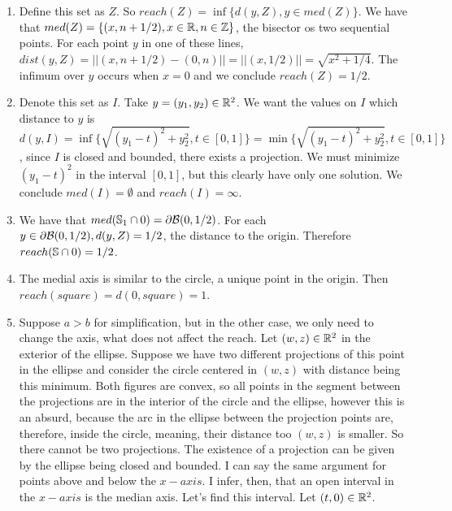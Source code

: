 \begin{enumerate}
    \item Define this set as $Z$. So $reach(Z) = \inf\{d(y,Z), y \in
    med(Z)\}$. We have that $med(Z) = \{(x,n+1/2), x \in \mathbb{R}, n \in \mathbb{Z}\}$, the
    bisector os two sequential points. For each point $y$ in one of these
    lines, $dist(y,Z) = ||(x,n+1/2) - (0,n)|| = ||(x,1/2)|| = \sqrt{x^2 +
    1/4}$. The infimum over $y$ occurs when $x = 0$ and we conclude $reach(Z)
    = 1/2$. 

    \item Denote this set as $I$. Take $y = (y_1, y_2) \in \mathbb{R}^2$. We want
    the values on $I$ which distance to $y$ is $d(y,I) = \inf\{\sqrt{(y_1 -
    t)^2 + y_2^2}, t \in [0,1] \} = \min\{\sqrt{(y_1 -
    t)^2 + y_2^2}, t \in [0,1] \}$, since $I$ is closed and bounded, there exists a projection. We must
    minimize $(y_1 - t)^2$ in the interval $[0,1]$, but this clearly have only
    one solution. We conclude $med(I) = \emptyset$ and $reach(I) = \infty$. 
    
    \item We have that $med(\mathbb{S}_1 \cap 0) = \partial\mathcal{B}(0,1/2)$. For each
    $y \in \partial\mathcal{B}(0,1/2), d(y,Z) = 1/2$, the distance to the origin.
    Therefore $reach(\mathbb{S} \cap 0) = 1/2$. 

    \item The medial axis is similar to the circle, a unique point in the
    origin. Then $reach(square) = d(0,square) = 1$. 

    \item Suppose $a > b$ for simplification, but in the other  case, we only
    need to change the axis, what does not affect the reach. Let $(w,z) \in \mathbb{R}^2$ in the exterior of the ellipse. Suppose we have
    two different projections of this point in the ellipse and consider the
    circle centered in $(w,z)$ with distance being this minimum. Both figures
    are convex, so all points in the segment between the projections are in
    the interior of the circle and the ellipse, however this is an absurd, because
    the arc in the ellipse between the projection points are,
    therefore, inside the circle, meaning, their distance too $(w,z)$ is smaller.
    So there cannot be two projections. The existence of a projection can be
    given by the ellipse being closed and bounded. I can say the same argument
    for points above and below the $x-axis$. I infer, then, that an open
    interval in the $x-axis$ is the median axis. Let's find this interval. Let
    $(t,0) \in \mathbb{R}^2$. 


\end{enumerate}
